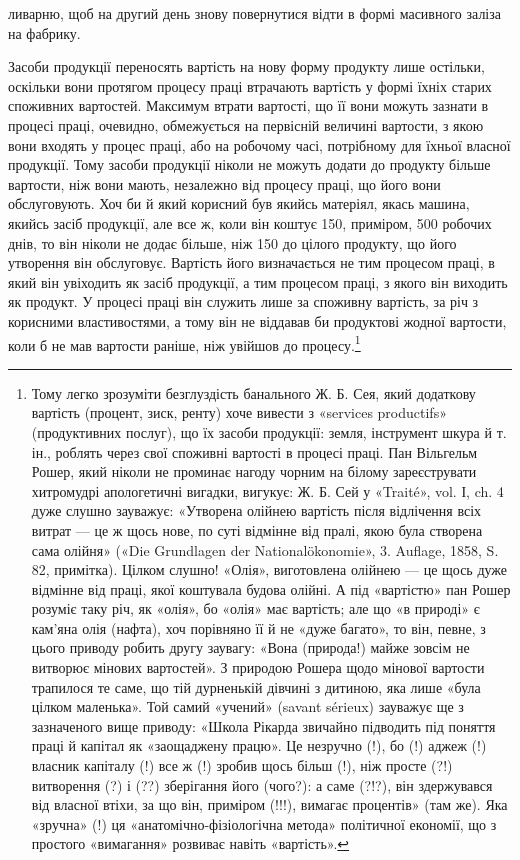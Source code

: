 \parcont{}  %
ливарню, щоб на другий день знову повернутися відти в формі
масивного заліза на фабрику.

Засоби продукції переносять вартість на нову форму продукту
лише остільки, оскільки вони протягом процесу праці втрачають
вартість у формі їхніх старих споживних вартостей. Максимум втрати вартості,
що її вони можуть зазнати в процесі праці, очевидно,
обмежується на первісній величині вартости, з якою вони
входять у процес праці, або на робочому часі, потрібному для
їхньої власної продукції. Тому засоби продукції ніколи не можуть
додати до продукту більше вартости, ніж вони мають, незалежно
від процесу праці, що його вони обслуговують. Хоч би й який
корисний був якийсь матеріял, якась машина, якийсь засіб продукції,
але все ж, коли він коштує 150, приміром,
500 робочих днів, то він ніколи не додає більше, ніж 150 до цілого продукту, що його утворення він обслуговує.
Вартість його визначається не тим процесом праці, в який
він увіходить як засіб продукції, а тим процесом праці, з якого
він виходить як продукт. У процесі праці він служить лише за
споживну вартість, за річ з корисними властивостями, а тому він
не віддавав би продуктові жодної вартости, коли б не мав вартости
раніше, ніж увійшов до процесу.\footnote{
Тому легко зрозуміти безглуздість банального Ж. Б. Сея, який додаткову
вартість (процент, зиск, ренту) хоче вивести з «services productifs»
(продуктивних послуг), що їх засоби продукції: земля, інструмент
шкура й т. ін., роблять через свої споживні вартості в процесі праці.
Пан Вільгельм Рошер, який ніколи не проминає нагоду чорним на білому
зареєструвати хитромудрі апологетичні вигадки, вигукує: Ж. Б. Сей
у «Traité», vol. І, ch. 4 дуже слушно зауважує: «Утворена олійнею вартість
після відлічення всіх витрат — це ж щось нове, по суті відмінне від
пралі, якою була створена сама олійня» («Die Grundlagen der Nationalökonomie»,
3. Auflage, 1858, S. 82, примітка). Цілком слушно! «Олія»,
виготовлена олійнею — це щось дуже відмінне від праці, якої коштувала
будова олійні. А під «вартістю» пан Рошер розуміє таку річ, як «олія»,
бо «олія» має вартість; але що «в природі» є кам’яна олія (нафта), хоч
порівняно її й не «дуже багато», то він, певне, з цього приводу робить
другу заувагу: «Вона (природа!) майже зовсім не витворює мінових
вартостей». З природою Рошера щодо мінової вартости трапилося те саме,
що тій дурненькій дівчині з дитиною, яка лише «була цілком маленька».
Той самий «учений» (savant sérieux) зауважує ще з зазначеного вище
приводу: «Школа Рікарда звичайно підводить під поняття праці й капітал
як «заощаджену працю». Це незручно (!), бо (!) аджеж (!) власник капіталу
(!) все ж (!) зробив щось більш (!), ніж просте (?!) витворення (?)
і (??) зберігання його (чого?): а саме (?!?), він здержувався від власної
втіхи, за що він, приміром (!!!), вимагає процентів» (там же). Яка «зручна»
(!) ця «анатомічно-фізіологічна метода» політичної економії, що з
простого «вимагання» розвиває навіть «вартість».
}

